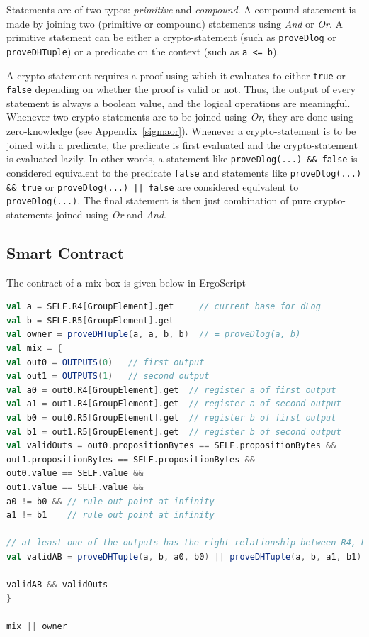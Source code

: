 \documentclass[runningheads]{llncs}
\begin{document}
Statements are of two types: {\em primitive} and {\em compound}. A compound statement is made by joining two (primitive or compound) statements using {\em And} or {\em Or}. A primitive statement can be either a {\en crypto-statement} (such as \texttt{proveDlog} or \texttt{proveDHTuple}) or a predicate on the context (such as \texttt{a <= b}).

A crypto-statement requires a proof using which it evaluates to either \texttt{true} or \texttt{false} depending on whether the proof is valid or not.
Thus, the output of every statement is always a boolean value, and the logical operations are meaningful.
Whenever two crypto-statements are to be joined using {\em Or}, they are done using zero-knowledge (see  Appendix~\ref{sigmaor}).
Whenever a crypto-statement is to be joined with a predicate, the predicate is first evaluated and the crypto-statement is evaluated lazily. In other words, a statement like \texttt{proveDlog(...) \&\& false} is considered equivalent to the predicate \texttt{false} and statements like \texttt{proveDlog(...) \&\& true} or \texttt{proveDlog(...) || false} are considered equivalent to \texttt{proveDlog(...)}. The final statement is then just combination of pure crypto-statements joined using {\em Or} and {\em And}.

\subsection{Smart Contract}
\label{smart-contract}

The contract of a mix box is given below in ErgoScript
\begin{lstlisting}[language=Scala,caption={Mix-script},label=mixScript]
val a = SELF.R4[GroupElement].get     // current base for dLog
val b = SELF.R5[GroupElement].get
val owner = proveDHTuple(a, a, b, b)  // = proveDlog(a, b)
val mix = {
val out0 = OUTPUTS(0)   // first output
val out1 = OUTPUTS(1)   // second output
val a0 = out0.R4[GroupElement].get  // register a of first output
val a1 = out1.R4[GroupElement].get  // register a of second output
val b0 = out0.R5[GroupElement].get  // register b of first output
val b1 = out1.R5[GroupElement].get  // register b of second output
val validOuts = out0.propositionBytes == SELF.propositionBytes &&
out1.propositionBytes == SELF.propositionBytes &&
out0.value == SELF.value &&
out1.value == SELF.value &&
a0 != b0 && // rule out point at infinity
a1 != b1    // rule out point at infinity

// at least one of the outputs has the right relationship between R4, R5
val validAB = proveDHTuple(a, b, a0, b0) || proveDHTuple(a, b, a1, b1)

validAB && validOuts
}

mix || owner
\end{lstlisting}
\end{document}
